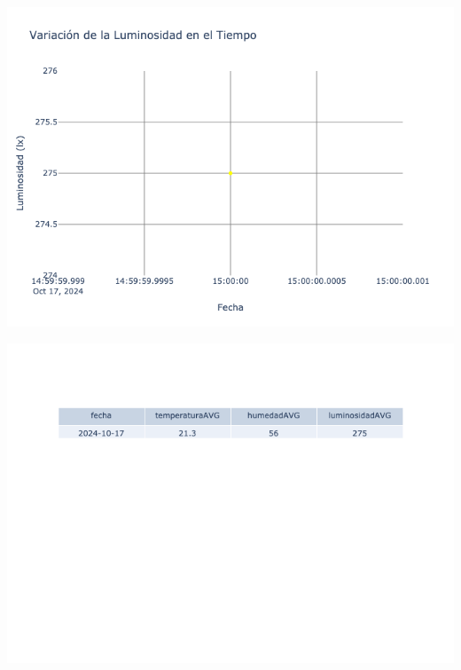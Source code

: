 \documentclass{article}
\begin{document}
    \noindent
    \begin{minipage}{0.48\textwidth}
        \centering
        \includegraphics[width=\textwidth]{../img/poli/LS603-90Dias-03-12-2024.png}
    \end{minipage}
    \hfill
    \begin{minipage}{0.48\textwidth}
        \centering
        \includegraphics[width=\textwidth]{../img/tables/CAVG603-90Dias-03-12-2024.png}
    \end{minipage}
    
\end{document}
